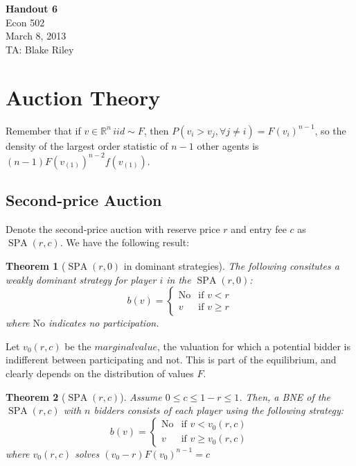 \documentclass[letter, 10pt]{article}
\newtheorem{theorem}{Theorem}[section]
\theoremstyle{definition}
\newcommand{\R}{\mathbb{R}}
\DeclareMathOperator{\SPA}{SPA}
\begin{document}
\begin{spacing}{1.1}

\noindent
\textbf{Handout 6} \\
Econ 502 \\
March 8, 2013 \\
TA: Blake Riley \\

\section{Auction Theory}

Remember that if $v\in \R^n\,iid \sim F$, then
$P(v_i>v_j, \forall j \ne i) = F(v_i)^{n-1}$, so
the density of the largest order statistic of $n-1$ other
agents is $(n-1)F(v_{(1)})^{n-2} f(v_{(1)})$.


\subsection{Second-price Auction}

Denote the second-price auction with reserve price $r$
and entry fee $c$ as $\SPA(r,c)$. We have the following
result:

\begin{theorem}[$\SPA(r,0)$ in dominant strategies] The
  following consitutes a weakly dominant strategy for
  player $i$ in the $\SPA(r,0)$:
  \begin{equation}
    b(v) =
    \begin{cases}
       \mathrm{No} & \mbox{if } v < r \\
      v & \mbox{if } v \ge r
    \end{cases}
  \end{equation}
  where $ \mathrm{No}$ indicates no participation.
\end{theorem}

Let $v_0(r,c)$ be the $marginal value$, the valuation for
which a potential bidder is indifferent between
participating and not. This is part of the equilibrium,
and clearly depends on the distribution of values $F$.

\begin{theorem}[$\SPA(r,c)$]
  Assume $0 \le c \le 1-r \le 1$. Then, a BNE of
  the $\SPA(r,c)$ with $n$ bidders consists of each player using the
  following strategy:
    \begin{equation}
    b(v) =
    \begin{cases}
      \mathrm{No} & \mbox{if } v < v_0(r,c) \\
      v & \mbox{if } v \ge v_0(r,c)
    \end{cases}
  \end{equation}
  where $v_0(r,c)$ solves $(v_0 - r)F(v_0)^{n-1} = c$
\end{theorem}


\end{spacing}
\end{document}
